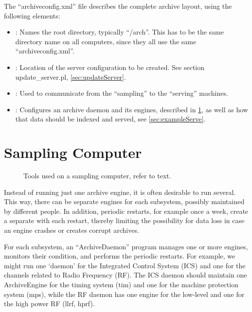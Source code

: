 

\noindent The ``archiveconfig.xml'' file describes the complete archive layout,
using the following elements:
\begin{itemize}
\item {}: Names the root directory, typically ``/arch''.
      This has to be the same directory name on all computers,
      since they all use the same ``archiveconfig.xml''.
\item {}: Location of the server configuration to be
      created. See section update\_server.pl, \ref{sec:updateServer}.
\item {}: Used to communicate from the ``sampling'' to the
      ``serving'' machines.
\item {}: Configures an archive daemon and its engines,
      described in \ref{sec:exampleSample},
      as well as how that data should be indexed and served,
      see \ref{sec:exampleServe}.
\end{itemize}

\section{Sampling Computer} \label{sec:exampleSample}
\begin{figure}[htb]
\begin{center}
\end{center}
\caption{\label{fig:acSample}Tools used on a sampling computer, refer to text.}
\end{figure}

\noindent Instead of running just one archive engine, it is often desirable to
run several. This way, there can be separate engines for each
subsystem, possibly maintained by different people.  In addition,
periodic restarts, for example once a week, create a separate
 with each restart, thereby limiting the
possibility for data loss in case an engine crashes or creates corrupt
archives.

For each subsystem, an ``ArchiveDaemon'' program manages one or more
engines, monitors their condition, and performs the periodic restarts.
For example, we might run one `daemon' for the Integrated Control
System (ICS) and one for the channels related to Radio Frequency (RF).
The ICS daemon should maintain one ArchiveEngine for the timing system
(tim) and one for the machine protection system (mps), while the RF
daemon has one engine for the low-level and one for the high power RF
(llrf, hprf).

